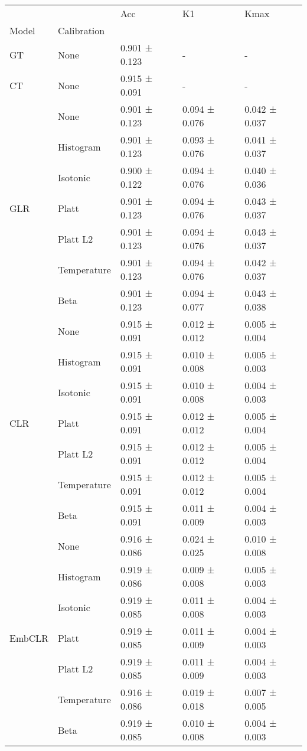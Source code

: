 \begin{tabular}{lllll}
\toprule
 &  & Acc & K1 & Kmax \\
Model & Calibration &  &  &  \\
\midrule
GT & None & 0.901 ± 0.123 & - & - \\
\cline{1-5}
CT & None & 0.915 ± 0.091 & - & - \\
\cline{1-5}
\multirow[t]{7}{*}{GLR} & None & 0.901 ± 0.123 & 0.094 ± 0.076 & 0.042 ± 0.037 \\
 & Histogram & 0.901 ± 0.123 & 0.093 ± 0.076 & 0.041 ± 0.037 \\
 & Isotonic & 0.900 ± 0.122 & 0.094 ± 0.076 & 0.040 ± 0.036 \\
 & Platt & 0.901 ± 0.123 & 0.094 ± 0.076 & 0.043 ± 0.037 \\
 & Platt L2 & 0.901 ± 0.123 & 0.094 ± 0.076 & 0.043 ± 0.037 \\
 & Temperature & 0.901 ± 0.123 & 0.094 ± 0.076 & 0.042 ± 0.037 \\
 & Beta & 0.901 ± 0.123 & 0.094 ± 0.077 & 0.043 ± 0.038 \\
\cline{1-5}
\multirow[t]{7}{*}{CLR} & None & 0.915 ± 0.091 & 0.012 ± 0.012 & 0.005 ± 0.004 \\
 & Histogram & 0.915 ± 0.091 & 0.010 ± 0.008 & 0.005 ± 0.003 \\
 & Isotonic & 0.915 ± 0.091 & 0.010 ± 0.008 & 0.004 ± 0.003 \\
 & Platt & 0.915 ± 0.091 & 0.012 ± 0.012 & 0.005 ± 0.004 \\
 & Platt L2 & 0.915 ± 0.091 & 0.012 ± 0.012 & 0.005 ± 0.004 \\
 & Temperature & 0.915 ± 0.091 & 0.012 ± 0.012 & 0.005 ± 0.004 \\
 & Beta & 0.915 ± 0.091 & 0.011 ± 0.009 & 0.004 ± 0.003 \\
\cline{1-5}
\multirow[t]{7}{*}{EmbCLR} & None & 0.916 ± 0.086 & 0.024 ± 0.025 & 0.010 ± 0.008 \\
 & Histogram & 0.919 ± 0.086 & 0.009 ± 0.008 & 0.005 ± 0.003 \\
 & Isotonic & 0.919 ± 0.085 & 0.011 ± 0.008 & 0.004 ± 0.003 \\
 & Platt & 0.919 ± 0.085 & 0.011 ± 0.009 & 0.004 ± 0.003 \\
 & Platt L2 & 0.919 ± 0.085 & 0.011 ± 0.009 & 0.004 ± 0.003 \\
 & Temperature & 0.916 ± 0.086 & 0.019 ± 0.018 & 0.007 ± 0.005 \\
 & Beta & 0.919 ± 0.085 & 0.010 ± 0.008 & 0.004 ± 0.003 \\
\cline{1-5}
\bottomrule
\end{tabular}
